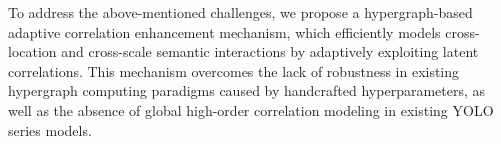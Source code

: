To address the above-mentioned challenges, we propose a hypergraph-based adaptive correlation enhancement mechanism, which efficiently models cross-location and cross-scale semantic interactions by adaptively exploiting latent correlations. This mechanism overcomes the lack of robustness in existing hypergraph computing paradigms caused by handcrafted hyperparameters, as well as the absence of global high-order correlation modeling in existing YOLO series models.
